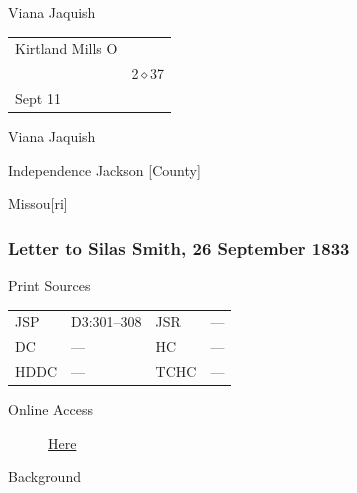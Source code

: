				\begin{tightright}
				\end{tightright}
				
				Viana Jaquish
				
				\begin{tabular}{p{3in}p{1in}}
				Kirtland Mills O & \\
				 & 2$\diamond$37 \\
				Sept 11 & \\
				\end{tabular}
				
				Viana Jaquish
				
				Independence Jackson [County]
				
				Missou[ri]
				
		\subsubsection{Letter to Silas Smith, 26 September 1833}
			\label{EMS-1833-JS-26-SEP-1833}
		
			\begin{description}
				\item[Print Sources]
			\end{description}

				\begin{tabular}{p{0.5in}p{1in}p{0.5in}p{1in}}
				JSP	 	& D3:301--308		& JSR 		& --- \\
				DC	 	& --- 		& HC 		& --- \\
				HDDC 	& ---		& TCHC 		& --- \\
				\end{tabular}
			
			\begin{description}
				\item[Online Access] \href{https://www.josephsmithpapers.org/paper-summary/letter-to-silas-smith-26-september-1833/1}{Here}
			\end{description}
			
			\begin{description}
				\item[Background]
			\end{description}
			
			
